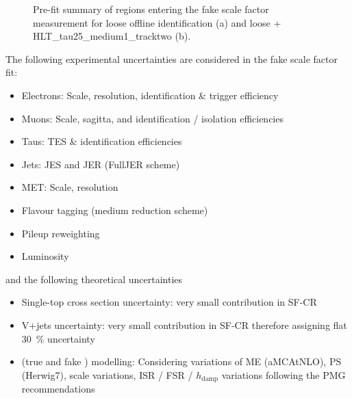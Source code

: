 \begin{figure}[htbp]
  \centering
  \caption{Pre-fit summary of regions entering the \ttbar fake scale factor measurement for loose offline \tauhad identification (a) and loose + HLT\_tau25\_medium1\_tracktwo (b).}
  \label{fig:ttbarfake_hadhad_prefit_summary}
\end{figure}

The following experimental uncertainties are considered in the fake scale factor fit:
\begin{itemize}
\item Electrons: Scale, resolution, identification \& trigger efficiency
\item Muons: Scale, sagitta, and identification / isolation efficiencies
\item Taus: TES \& identification efficiencies
\item Jets: JES and JER (FullJER scheme)
\item MET: Scale, resolution
\item Flavour tagging (medium reduction scheme)
\item Pileup reweighting
\item Luminosity
\end{itemize}
and the following theoretical uncertainties
\begin{itemize}
\item Single-top cross section uncertainty: very small contribution in SF-CR
\item V+jets uncertainty: very small contribution in SF-CR therefore
  assigning flat \SI{30}{\percent} uncertainty
\item \ttbar (true \tauhad and fake \tauhad) modelling: Considering
  variations of ME (aMCAtNLO), PS (Herwig7), scale variations, ISR /
  FSR / $h_\text{damp}$ variations following the PMG recommendations
\end{itemize}

